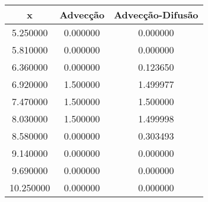 \begin{tabular}{ccc}
\toprule
x & Advecção & Advecção-Difusão \\
\midrule
5.250000 & 0.000000 & 0.000000 \\
5.810000 & 0.000000 & 0.000000 \\
6.360000 & 0.000000 & 0.123650 \\
6.920000 & 1.500000 & 1.499977 \\
7.470000 & 1.500000 & 1.500000 \\
8.030000 & 1.500000 & 1.499998 \\
8.580000 & 0.000000 & 0.303493 \\
9.140000 & 0.000000 & 0.000000 \\
9.690000 & 0.000000 & 0.000000 \\
10.250000 & 0.000000 & 0.000000 \\
\bottomrule
\end{tabular}
